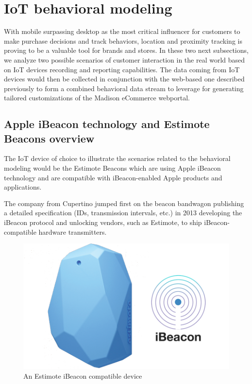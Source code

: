 \newpage
\section{IoT behavioral modeling}

With mobile surpassing desktop as the most critical influencer for customers to make purchase decisions and track behaviors, location and proximity tracking is proving to be a valuable tool for brands and stores.  In these two next subsections, we analyze two possible scenarios of customer interaction in the real world based on IoT devices recording and reporting capabilities. The data coming from IoT devices would then be collected in conjunction with the web-based one described previously to form a combined behavioral data stream to leverage for generating tailored customizations of the Madison eCommerce webportal.

\subsection{Apple iBeacon technology and Estimote Beacons overview}

The IoT device of choice to illustrate the scenarios related to the behavioral modeling would be the Estimote Beacons which are using Apple iBeacon technology and are compatible with iBeacon-enabled Apple products and applications.

The company from Cupertino jumped first on the beacon bandwagon publishing a detailed specification (IDs, transmission intervals, etc.) in 2013 developing the iBeacon protocol and unlocking vendors, such as Estimote, to ship iBeacon-compatible hardware transmitters.

\vspace{0.5cm}
\begin{figure}[H]
  \centering
    \includegraphics[width=16cm]{images/ibeacon.png}
  \caption{An Estimote iBeacon compatible device}
  \label{fig:estimote-beacon}
\end{figure}
\vspace{0.5cm}


